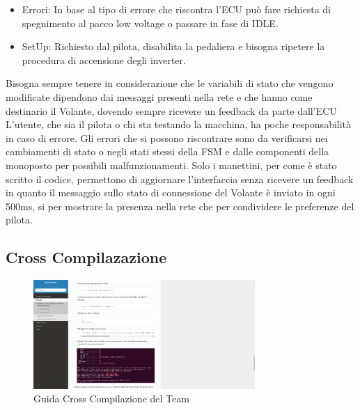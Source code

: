 \begin{itemize}
    \item Errori: In base al tipo di errore che riscontra l'ECU può fare richiesta di spegnimento al pacco low voltage o passare in fase di IDLE.
    \item SetUp: Richiesto dal pilota, disabilita la pedaliera e bisogna ripetere la procedura di accensione degli inverter. 
\end{itemize} 

Bisogna sempre tenere in considerazione che le variabili di stato che vengono modificate dipendono
dai messaggi presenti nella rete e che hanno come destinario il Volante, dovendo sempre ricevere un feedback da parte dall'ECU
L'utente, che sia il pilota o chi sta testando la macchina, ha poche responsabilità in caso di errore.
Gli errori che si possono riscontrare sono da verificarsi nei cambiamenti di stato o negli stati stessi della FSM e dalle componenti
della monoposto per possibili malfunzionamenti.  
Solo i manettini, per come è stato scritto il codice, permettono di aggiornare l'interfaccia senza ricevere un feedback
in quanto il messaggio sullo stato di connessione del Volante è inviato in ogni 500ms, si per mostrare la presenza nella rete
che per condividere le preferenze del pilota.


\newpage


\subsection{Cross Compilazazione}


\begin{figure}[hbt!]
    \centering
    \includegraphics[width=0.75\textwidth]{./figures/cross-compilazione.png}
    \caption{Guida Cross Compilazione del Team \cite{cross-compilazione}}
\end{figure}




